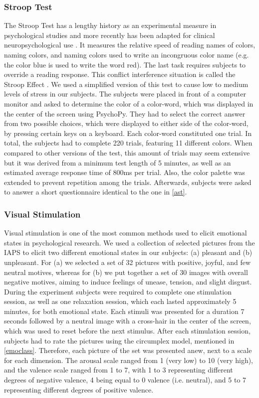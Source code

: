 \subsubsection{Stroop Test}
The Stroop Test has a lengthy history as an experimental measure in psychological studies and more recently has been adapted for clinical neuropsychological use \cite{mitrushina2005handbook}. It measures the relative speed of reading names of colors, naming colors, and naming colors used to write an incongruous color name (e.g. the color blue is used to write the word red). The last task requires subjects to override a reading response. This conflict interference situation is called the Stroop Effect \cite{mitrushina2005handbook}. 
We used a simplified version of this test to cause low to medium levels of stress in our subjects. The subjects were placed in front of a computer monitor and asked to determine the color of a color-word, which was displayed in the center of the screen using PsychoPy. They had to select the correct answer from two possible choices, which were displayed to either side of the color-word, by pressing certain keys on a keyboard. Each color-word constituted one trial. In total, the subjects had to complete 220 trials, featuring 11 different colors. When compared to other versions of the test, this amount of trials may seem extensive but it was derived from a minimum test length of 5 minutes, as well as an estimated average response time of 800ms per trial. Also, the color palette was extended to prevent repetition among the trials.
Afterwards, subjects were asked to answer a short questionnaire identical to the one in \ref{ast}.
\subsubsection{Visual Stimulation}
Visual stimulation is one of the most common methods used to elicit emotional states in psychological research. We used a collection of selected pictures from the IAPS to elicit two different emotional states in our subjects: (a) pleasant and (b) unpleasant. For (a) we selected a set of 32 pictures with positive, joyful, and few neutral motives, whereas for (b) we put together a set of 30 images with overall negative motives, aiming to induce feelings of unease, tension, and slight disgust. During the experiment subjects were required to complete one stimulation session, as well as one relaxation session, which each lasted approximately 5 minutes, for both emotional state. Each stimuli was presented for a duration 7 seconds followed by a neutral image with a cross-hair in the center of the screen, which was used to reset before the next stimulus.
After each stimulation session, subjects had to rate the pictures using the circumplex model, mentioned in \ref{emoclass}. Therefore, each picture of the set was presented anew, next to a scale for each dimension. The arousal scale ranged from 1 (very low) to 10 (very high), and the valence scale ranged from 1 to 7, with 1 to 3 representing different degrees of negative valence, 4 being equal to 0 valence (i.e. neutral), and 5 to 7 representing different degrees of positive valence. 

